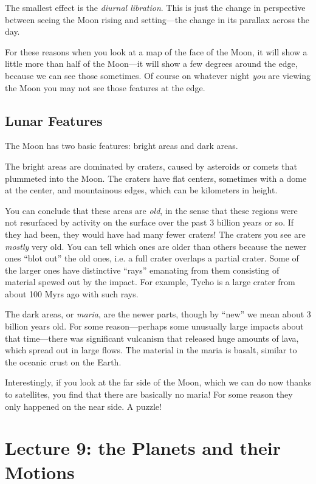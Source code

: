 \documentclass[12pt, preprint]{aastex}
\begin{document}
The smallest effect is the {\it diurnal libration}. This is just the
change in perspective between seeing the Moon rising and setting---the
change in its parallax across the day. 

For these reasons when you look at a map of the face of the Moon, it
will show a little more than half of the Moon---it will show a few
degrees around the edge, because we can see those sometimes. Of course
on whatever night {\it you} are viewing the Moon you may not see those
features at the edge.

\subsection{Lunar Features}

The Moon has two basic features: bright areas and dark areas.

The bright areas are dominated by craters, caused by asteroids or
comets that plummeted into the Moon. The craters have flat centers,
sometimes with a dome at the center, and mountainous edges, which can
be kilometers in height.

You can conclude that these areas are {\it old}, in the sense that
these regions were not resurfaced by activity on the surface over the
past 3 billion years or so. If they had been, they would have had many
fewer craters! The craters you see are {\it mostly} very old. You can
tell which ones are older than others because the newer ones ``blot
out'' the old ones, i.e. a full crater overlaps a partial crater. Some
of the larger ones have distinctive ``rays'' emanating from them
consisting of material spewed out by the impact. For example, Tycho is
a large crater from about 100 Myrs ago with such rays. 

The dark areas, or {\it maria}, are the newer parts, though by ``new''
we mean about 3 billion years old.  For some reason---perhaps some
unusually large impacts about that time---there was significant
vulcanism that released huge amounts of lava, which spread out in
large flows. The material in the maria is basalt, similar to the
oceanic crust on the Earth.

Interestingly, if you look at the far side of the Moon, which we can
do now thanks to satellites, you find that there are basically no
maria! For some reason they only happened on the near side. A puzzle!

\clearpage
\section{Lecture 9: the Planets and their Motions}
\end{document}
